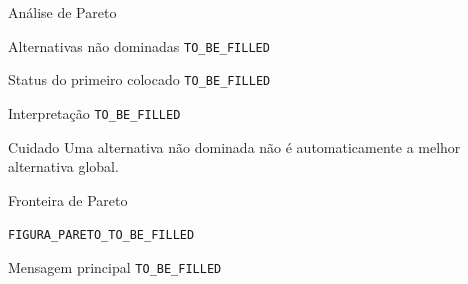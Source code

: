 
\begin{frame}{Análise de Pareto}

    \begin{block}{Alternativas não dominadas}
        \texttt{TO\_BE\_FILLED}
    \end{block}

    \vspace{0.3cm}

    \begin{block}{Status do primeiro colocado}
        \texttt{TO\_BE\_FILLED}
    \end{block}

    \vspace{0.3cm}

    \begin{block}{Interpretação}
        \texttt{TO\_BE\_FILLED}
    \end{block}

    \vspace{0.2cm}

    \begin{alertblock}{Cuidado}
        Uma alternativa não dominada não é automaticamente a melhor
        alternativa global.
    \end{alertblock}

\end{frame}



\begin{frame}{Fronteira de Pareto}

    \begin{center}

        \texttt{FIGURA\_PARETO\_TO\_BE\_FILLED}

    \end{center}

    \vspace{0.3cm}

    \begin{block}{Mensagem principal}
        \texttt{TO\_BE\_FILLED}
    \end{block}

\end{frame}


